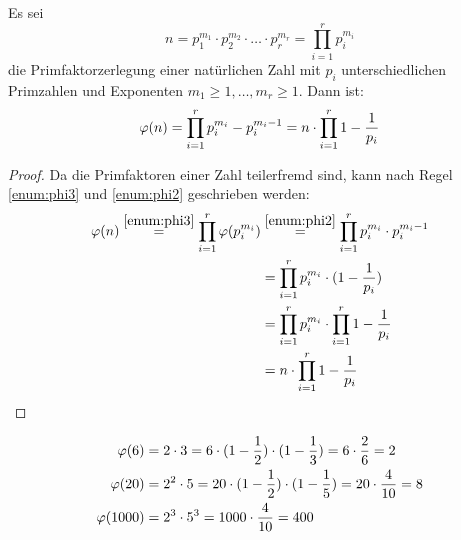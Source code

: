 \begin{satz}
  Es sei
  \begin{equation*}
    n = p_1^{m_1} \cdot p_2^{m_2} \cdot \ldots \cdot p_r^{m_r} = \prod_{i=1}^{r} p_i^{m_i}
  \end{equation*}
  die Primfaktorzerlegung einer natürlichen Zahl mit $p_i$ unterschiedlichen Primzahlen
  und Exponenten $m_1 \geq 1,\ldots, m_r \geq 1$. Dann ist:
  \begin{equation*}
    \varphi(n) = \prod_{i=1}^{r} p_i^{m_i} - p_i^{m_i - 1} =
    n \cdot \prod_{i=1}^{r} 1 - \frac{1}{p_i}
  \end{equation*}
\end{satz}
\newpage
\begin{proof}
  Da die Primfaktoren einer Zahl teilerfremd sind, kann nach Regel \ref{enum:phi3}
  und \ref{enum:phi2} geschrieben werden:
  \begin{align*}
    \varphi(n) \stackrel{\ref{enum:phi3}}{=} \prod_{i=1}^{r} \varphi(p_i^{m_i})
     & \stackrel{\ref{enum:phi2}}{=} \prod_{i=1}^{r} p_i^{m_i} \cdot p_i^{m_i - 1} \\
     & = \prod_{i=1}^{r} p_i^{m_i} \cdot (1 - \frac{1}{p_i})                 \\
     & = \prod_{i=1}^{r} p_i^{m_i} \cdot \prod_{i=1}^{r} 1 - \frac{1}{p_i}   \\
     & = n \cdot \prod_{i=1}^{r} 1 - \frac{1}{p_i}
  \end{align*}
\end{proof}

\begin{example}
  \begin{align*}
    \varphi(6)    & = 2 \cdot 3 = 6 \cdot (1 - \frac{1}{2}) \cdot (1 - \frac{1}{3}) =
    6 \cdot \frac{2}{6} = 2                                                            \\
    \varphi(20)   & = 2^2 \cdot 5 = 20 \cdot (1 - \frac{1}{2}) \cdot (1 - \frac{1}{5}) =
    20 \cdot \frac{4}{10} = 8                                                          \\
    \varphi(1000) & = 2^3 \cdot 5^3 = 1000 \cdot \frac{4}{10} = 400
  \end{align*}
\end{example}
